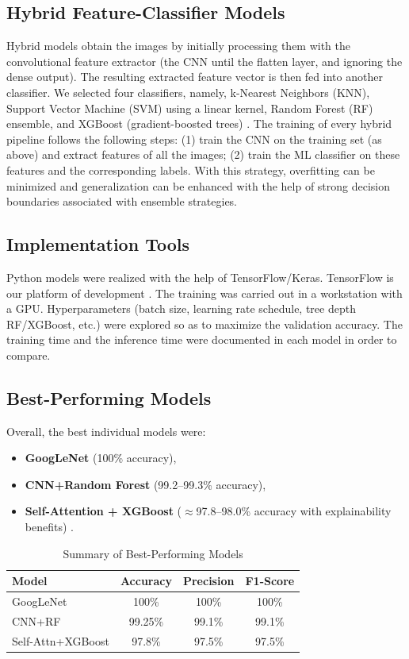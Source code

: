 \documentclass[conference]{IEEEtran}
\begin{document}
\subsection{Hybrid Feature-Classifier Models}
Hybrid models obtain the images by initially processing them with the convolutional feature extractor (the CNN until the flatten layer, and ignoring the dense output). The resulting extracted feature vector is then fed into another classifier. We selected four classifiers, namely, k-Nearest Neighbors (KNN), Support Vector Machine (SVM) using a linear kernel, Random Forest (RF) ensemble, and XGBoost (gradient-boosted trees) \cite{Chen2016}. The training of every hybrid pipeline follows the following steps: (1) train the CNN on the training set (as above) and extract features of all the images; (2) train the ML classifier on these features and the corresponding labels. With this strategy, overfitting can be minimized and generalization can be enhanced with the help of strong decision boundaries associated with ensemble strategies.

\subsection{Implementation Tools}
Python models were realized with the help of TensorFlow/Keras. TensorFlow is our platform of development \cite{TensorFlow2016}. The training was carried out in a workstation with a GPU. Hyperparameters (batch size, learning rate schedule, tree depth RF/XGBoost, etc.) were explored so as to maximize the validation accuracy. The training time and the inference time were documented in each model in order to compare.

\subsection{Best-Performing Models}
Overall, the best individual models were:
\begin{itemize}
    \item \textbf{GoogLeNet} (100\% accuracy),
    \item \textbf{CNN+Random Forest} (99.2--99.3\% accuracy),
    \item \textbf{Self-Attention + XGBoost} ($\approx$97.8--98.0\% accuracy with explainability benefits) \cite{Attention2025}.
\end{itemize}

\begin{table}[htbp]
\centering
\caption{Summary of Best-Performing Models}
\label{tab:best_models}
\begin{tabular}{|l|c|c|c|}
\hline
\textbf{Model} & \textbf{Accuracy} & \textbf{Precision} & \textbf{F1-Score} \\
\hline
GoogLeNet & 100\% & 100\% & 100\% \\
CNN+RF & 99.25\% & 99.1\% & 99.1\% \\
Self-Attn+XGBoost & 97.8\% & 97.5\% & 97.5\% \\
\hline
\end{tabular}
\end{table}
\end{document}
